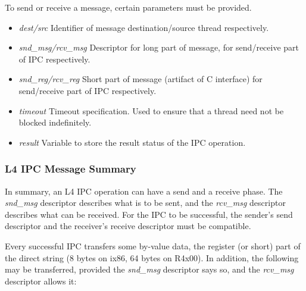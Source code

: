 To send or receive a message, certain parameters must be provided.

\begin{itemize}
        
\item \emph{dest/src} Identifier of message destination/source thread
  respectively.
        
\item \emph{snd\_msg/rcv\_msg} Descriptor for long part of message,
  for send/receive part of IPC respectively.

\item \emph{snd\_reg/rcv\_reg} Short part of message (artifact of C
  interface) for send/receive part of IPC respectively.

\item \emph{timeout} Timeout specification. Used to ensure that a
  thread need not be blocked indefinitely.

\item \emph{result} Variable to store the result status of the IPC
  operation.

\end{itemize}



\cbstart
\subsubsection{L4 IPC Message Summary}

In summary, an L4 IPC operation can have a send and a receive
phase.  The \emph{snd\_msg} descriptor describes what is to be sent, and the
\emph{rcv\_msg} descriptor describes what can be received. For the IPC to be
successful, the sender's send descriptor and the receiver's receive
descriptor must be compatible.

Every successful IPC transfers some by-value data, the register (or
short) part of the direct string (8 bytes on ix86, 64 bytes on
R4x00). In addition, the following may be transferred, provided the
\emph{snd\_msg} descriptor says so, and the \emph{rcv\_msg} descriptor
allows it:

